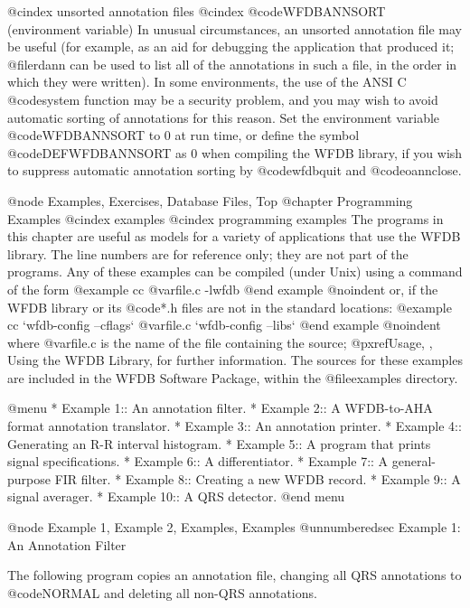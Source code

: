 {{{{{{{{{{{{{{@cindex unsorted annotation files
@cindex @code{WFDBANNSORT} (environment variable)
In unusual circumstances, an unsorted annotation file may be useful (for
example, as an aid for debugging the application that produced it; @file{rdann}
can be used to list all of the annotations in such a file, in the order in
which they were written).  In some environments, the use of the ANSI C
@code{system} function may be a security problem, and you may wish to avoid
automatic sorting of annotations for this reason.  Set the environment variable
@code{WFDBANNSORT} to 0 at run time, or define the symbol @code{DEFWFDBANNSORT}
as 0 when compiling the WFDB library, if you wish to suppress automatic
annotation sorting by @code{wfdbquit} and @code{oannclose}.

@node Examples, Exercises, Database Files, Top
@chapter Programming Examples
@cindex examples
@cindex programming examples
The programs in this chapter are useful as models for a variety of
applications that use the WFDB library.  The line numbers are for
reference only; they are not part of the programs.  Any of these
examples can be compiled (under Unix) using a command of the form
@example
cc @var{file.c} -lwfdb
@end example
@noindent
or, if the WFDB library or its @code{*.h} files are not in the standard
locations:
@example
cc `wfdb-config --cflags` @var{file.c} `wfdb-config --libs`
@end example
@noindent
where @var{file.c} is the name of the file containing the source;
@pxref{Usage, , Using the WFDB Library}, for further information.
The sources for these examples are included in the WFDB Software Package,
within the @file{examples} directory.

@menu
* Example 1::			An annotation filter.
* Example 2::			A WFDB-to-AHA format annotation translator.
* Example 3::			An annotation printer.
* Example 4::			Generating an R-R interval histogram.
* Example 5::			A program that prints signal specifications.
* Example 6::			A differentiator.
* Example 7::			A general-purpose FIR filter.
* Example 8::			Creating a new WFDB record.
* Example 9::			A signal averager.
* Example 10::			A QRS detector.
@end menu

@node     Example 1, Example 2, Examples, Examples
@unnumberedsec Example 1:  An Annotation Filter

The following program copies an annotation file, changing all QRS annotations
to @code{NORMAL} and deleting all non-QRS annotations.

}}}}}}}}}}}}}}
